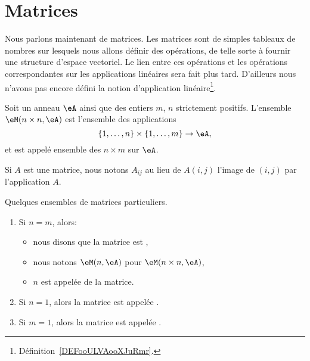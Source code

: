 \section{Matrices}

Nous parlons maintenant de matrices. Les matrices sont de simples tableaux de nombres sur lesquels nous allons définir des opérations, de telle sorte à fournir une structure d'espace vectoriel. Le lien entre ces opérations et les opérations correspondantes sur les applications linéaires sera fait plus tard. D'ailleurs nous n'avons pas encore défini la notion d'application linéaire\footnote{Définition~\ref{DEFooULVAooXJuRmr}.}.


\begin{definition}
    Soit un anneau \( \eA\) ainsi que des entiers \( m\), \( n\) strictement positifs. L'ensemble \( \eM(n\times n,\eA)\) est l'ensemble des applications
    \begin{equation}
        \{ 1,\ldots, n \}\times \{ 1,\ldots, m \}\to \eA,
    \end{equation}
    et est appelé ensemble des  \(n\times m\) sur \( \eA \).
\end{definition}
Si \( A\) est une matrice, nous notons \( A_{ij}\) au lieu de \( A(i,j)\) l'image de \( (i,j)\) par l'application \( A\).


\begin{definition}
Quelques ensembles de matrices particuliers.
  \begin{enumerate}
  \item Si \( n=m\), alors:
  \begin{itemize}
    \item nous disons que la matrice est ,
    \item nous notons \( \eM(n,\eA)\) pour \( \eM(n\times n,\eA)\),
    \item \( n \) est appelée  de la matrice.
  \end{itemize}
  \item Si \( n = 1 \), alors la matrice est appelée .
    \item Si \( m = 1 \), alors la matrice est appelée .
  \end{enumerate}
\end{definition}

